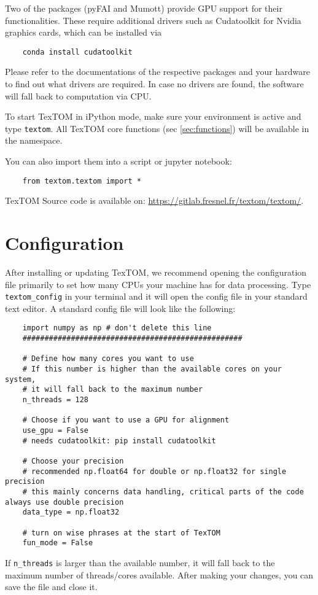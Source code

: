 Two of the packages (pyFAI and Mumott) provide GPU support for their functionalities.
These require additional drivers such as Cudatoolkit for Nvidia graphics cards, which
can be installed via 
\begin{verbatim}
    conda install cudatoolkit
\end{verbatim}
Please refer to the documentations of the respective packages and your hardware
to find out what drivers are required.
In case no drivers are found, the software will fall back to computation via CPU.

To start TexTOM in iPython mode, make sure your environment is active and type \texttt{textom}.
All TexTOM core functions (sec \ref{sec:functions}) will be available in the namespace.

You can also import them into a script or jupyter notebook:
\begin{verbatim}
    from textom.textom import *
\end{verbatim}

TexTOM Source code is available on:
\url{https://gitlab.fresnel.fr/textom/textom/}.



\newpage
\section{Configuration}
After installing or updating TexTOM, we recommend opening the configuration file primarily to set how many CPUs your machine has
for data processing. Type \texttt{textom\_config} in your terminal and it will open the config file in your standard
text editor. A standard config file will look like the following:
\begin{verbatim}
    import numpy as np # don't delete this line
    ##################################################

    # Define how many cores you want to use 
    # If this number is higher than the available cores on your system, 
    # it will fall back to the maximum number
    n_threads = 128 

    # Choose if you want to use a GPU for alignment
    use_gpu = False
    # needs cudatoolkit: pip install cudatoolkit

    # Choose your precision
    # recommended np.float64 for double or np.float32 for single precision
    # this mainly concerns data handling, critical parts of the code always use double precision
    data_type = np.float32

    # turn on wise phrases at the start of TexTOM
    fun_mode = False
\end{verbatim}
If \texttt{n\_threads} is larger than the available number, it will fall back to the maximum number of threads/cores available.
After making your changes, you can save the file and close it.
\newpage

